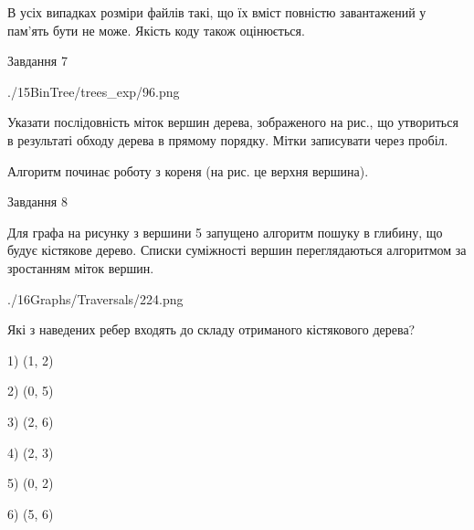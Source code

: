 \documentclass[12pt, ukrainian]{article}
\begin{document}
{В усіх випадках розміри файлів такі, що їх вміст повністю завантажений у пам'ять бути не може. Якість коду також оцінюється.



\vspace{10mm}\par

\newpage
\begin{minipage}[t]{9.7cm}
               
{\begin{center}Завдання {7}\end{center}}
\vspace{-6mm}

\begin{center}
	{./15BinTree/trees_exp/96.png}
\end{center}
Указати послідовність міток вершин дерева, зображеного на рис., що утвориться в результаті обходу дерева в прямому порядку. Мітки записувати через пробіл.\par Алгоритм починає роботу з кореня (на рис. це верхня вершина).\par

\end{minipage}
\vline \hspace{8mm}
\begin{minipage}[t]{8.0cm}
               
{\begin{center}Завдання {8}\end{center}}
\vspace{-6mm}
Для графа на рисунку з вершини 5 запущено алгоритм пошуку в глибину, що будує кістякове дерево. Списки суміжності вершин переглядаються алгоритмом за зростанням міток вершин.\par
\begin{center}
	{./16Graphs/Traversals/224.png}
\end{center}
\par Які з наведених ребер входять до складу отриманого кістякового дерева?\par
1) (1, 2)\par
2) (0, 5)\par
3) (2, 6)\par
4) (2, 3)\par
5) (0, 2)\par
6) (5, 6)\par
{\vskip 15pt} \par


\end{minipage}}
\end{document}
